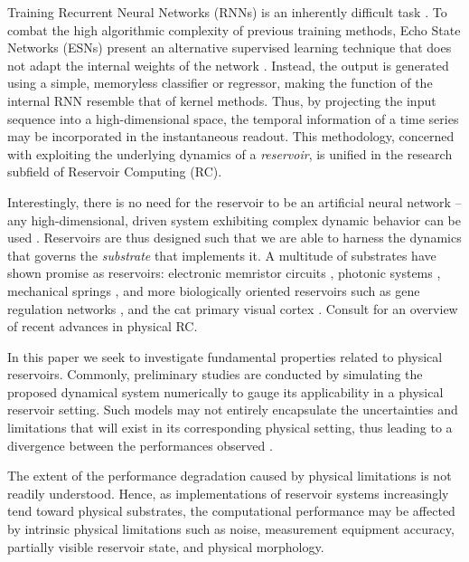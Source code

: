 Training Recurrent Neural Networks (RNNs) is an inherently difficult task
\cite{bengio_learning_1994}. To combat the high algorithmic complexity of
previous training methods, Echo State Networks (ESNs) present an alternative
supervised learning technique that does not adapt the internal weights of the
network \cite{jaeger_echo_2001}. Instead, the output is generated using a
simple, memoryless classifier or regressor, making the function of the internal
RNN resemble that of kernel methods. Thus, by projecting the input sequence into
a high-dimensional space, the temporal information of a time series may be
incorporated in the instantaneous readout. This methodology, concerned with
exploiting the underlying dynamics of a \textit{reservoir}, is unified in the
research subfield of Reservoir Computing (RC).

Interestingly, there is no need for the reservoir to be an artificial neural
network -- any high-dimensional, driven system exhibiting complex dynamic
behavior can be used \cite{schrauwen_overview_2007}. Reservoirs are thus
designed such that we are able to harness the dynamics that governs the
\textit{substrate} that implements it. A multitude of substrates have shown
promise as reservoirs: electronic memristor circuits
\cite{kulkarni_memristor-based_2012}, photonic systems
\cite{vandoorne_experimental_2014}, mechanical springs
\cite{hauser_towards_2011}, and more biologically oriented reservoirs such as
gene regulation networks \cite{jones_is_2007}, and the cat primary visual cortex
\cite{scholkopf_temporal_2007}. Consult \cite{tanaka_recent_2018} for an
overview of recent advances in physical RC.

In this paper we seek to investigate fundamental properties related to physical
reservoirs. Commonly, preliminary studies are conducted by simulating the
proposed dynamical system numerically to gauge its applicability in a physical
reservoir setting. Such models may not entirely encapsulate the uncertainties
and limitations that will exist in its corresponding physical setting, thus
leading to a divergence between the performances observed
\cite{vandoorne_experimental_2014, katumba_neuromorphic_2018,
  jensen_reservoir_2017}.

The extent of the performance degradation caused by physical limitations is not
readily understood. Hence, as implementations of reservoir systems increasingly
tend toward physical substrates, the computational performance may be affected
by intrinsic physical limitations such as noise, measurement equipment accuracy,
partially visible reservoir state, and physical morphology.

